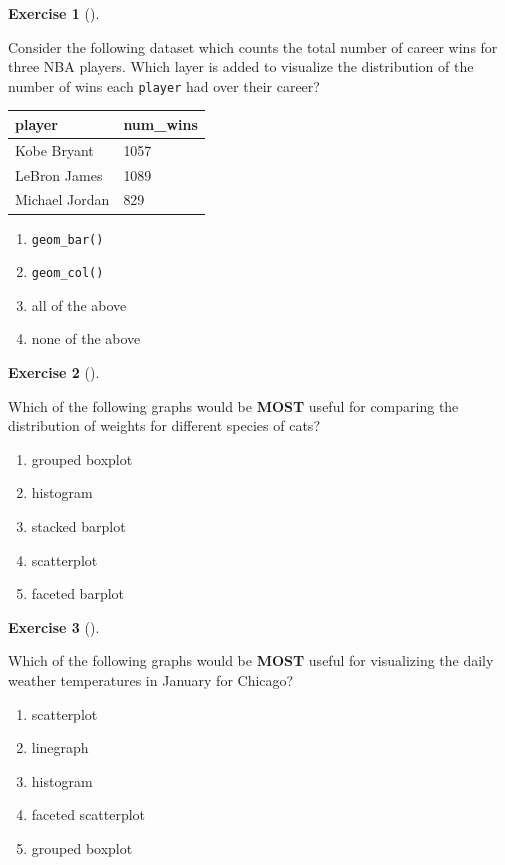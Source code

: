 \documentclass[
  letterpaper,
  DIV=11,
  numbers=noendperiod]{scrreprt}
\providecommand{\tightlist}{%
  \setlength{\itemsep}{0pt}\setlength{\parskip}{0pt}}\usepackage{longtable,booktabs,array}
\theoremstyle{definition}
\newtheorem{exercise}{Exercise}[chapter]
\theoremstyle{remark}
\begin{document}
\begin{exercise}[]\protect\hypertarget{exr-ch02-c05}{}\label{exr-ch02-c05}

Consider the following dataset which counts the total number of career
wins for three NBA players. Which layer is added to visualize the
distribution of the number of wins each \texttt{player} had over their
career?

\begin{longtable}[]{@{}ll@{}}
\toprule\noalign{}
player & num\_wins \\
\midrule\noalign{}
\endhead
\bottomrule\noalign{}
\endlastfoot
Kobe Bryant & 1057 \\
LeBron James & 1089 \\
Michael Jordan & 829 \\
\end{longtable}

\begin{enumerate}
\def\labelenumi{\alph{enumi})}
\tightlist
\item
  \texttt{geom\_bar()}
\item
  \texttt{geom\_col()}
\item
  all of the above
\item
  none of the above
\end{enumerate}

\end{exercise}

\begin{exercise}[]\protect\hypertarget{exr-ch02-c06}{}\label{exr-ch02-c06}

Which of the following graphs would be \textbf{MOST} useful for
comparing the distribution of weights for different species of cats?

\begin{enumerate}
\def\labelenumi{\alph{enumi})}
\tightlist
\item
  grouped boxplot
\item
  histogram
\item
  stacked barplot
\item
  scatterplot
\item
  faceted barplot
\end{enumerate}

\end{exercise}

\begin{exercise}[]\protect\hypertarget{exr-ch02-c07}{}\label{exr-ch02-c07}

Which of the following graphs would be \textbf{MOST} useful for
visualizing the daily weather temperatures in January for Chicago?

\begin{enumerate}
\def\labelenumi{\alph{enumi})}
\tightlist
\item
  scatterplot
\item
  linegraph
\item
  histogram
\item
  faceted scatterplot
\item
  grouped boxplot
\end{enumerate}

\end{exercise}
\end{document}
